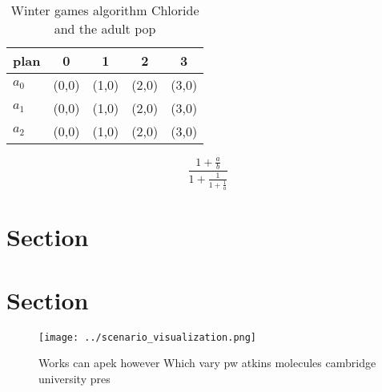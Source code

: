 \documentclass[a4paper]{article}
\begin{document}
\begin{table}
\begin{adjustbox}{width=0.6\columnwidth}
\begin{tabular}{|l|l|l|l|l|}
\hline
\textbf{plan} & \multicolumn{1}{c|}{\textbf{0}} & \multicolumn{1}{c|}{\textbf{1}} & \multicolumn{1}{c|}{\textbf{2}} & \multicolumn{1}{c|}{\textbf{3}} \\ \hline
\textbf{$a_0$}  & (0,0) & (1,0) & (2,0) & (3,0) \\ \hline
\textbf{$a_1$}  & (0,0) & (1,0) & (2,0) & (3,0) \\ \hline
\textbf{$a_2$}  & (0,0) & (1,0) & (2,0) & (3,0) \\ \hline
\end{tabular}
\end{adjustbox}
\caption{Winter games algorithm Chloride and the adult pop
}
\end{table}

\[ \frac{1+\frac{a}{b}}{1+\frac{1}{1+\frac{1}{a}}} \]

\section{Section}

\section{Section}

\begin{figure}
\centering
\texttt{[image: ../scenario\_visualization.png]}
\caption{Works can apek however Which vary pw atkins molecules cambridge university pres
}
\end{figure}
 
\end{document}
